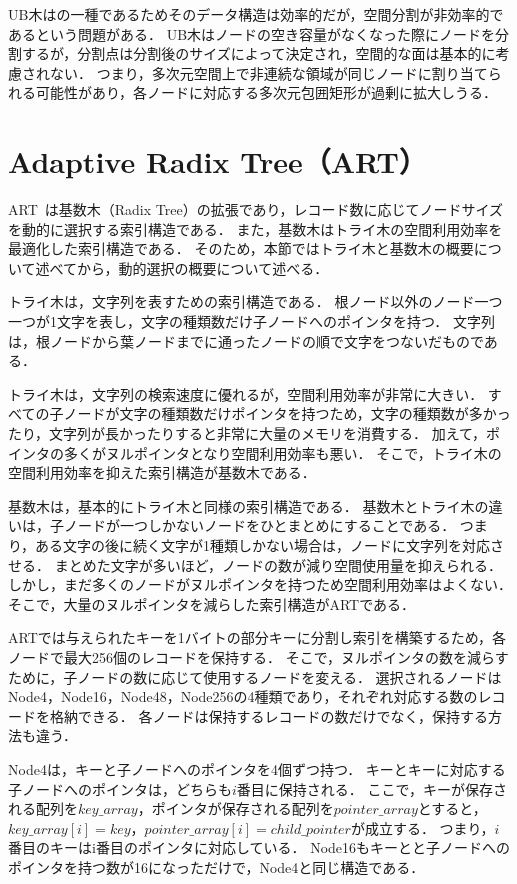 UB木は\BTree{}の一種であるためそのデータ構造は効率的だが，空間分割が非効率的であるという問題がある．
UB木はノードの空き容量がなくなった際にノードを分割するが，分割点は分割後のサイズによって決定され，空間的な面は基本的に考慮されない．
つまり，多次元空間上で非連続な領域が同じノードに割り当てられる可能性があり，各ノードに対応する多次元包囲矩形が過剰に拡大しうる．

\section{Adaptive Radix Tree（ART）}

ART~\cite{icde:Leis2013}は基数木（Radix Tree）の拡張であり，レコード数に応じてノードサイズを動的に選択する索引構造である．
また，基数木はトライ木の空間利用効率を最適化した索引構造である．
そのため，本節ではトライ木と基数木の概要について述べてから，動的選択の概要について述べる．

トライ木は，文字列を表すための索引構造である．
根ノード以外のノード一つ一つが1文字を表し，文字の種類数だけ子ノードへのポインタを持つ．
文字列は，根ノードから葉ノードまでに通ったノードの順で文字をつないだものである．

トライ木は，文字列の検索速度に優れるが，空間利用効率が非常に大きい．
すべての子ノードが文字の種類数だけポインタを持つため，文字の種類数が多かったり，文字列が長かったりすると非常に大量のメモリを消費する．
加えて，ポインタの多くがヌルポインタとなり空間利用効率も悪い．
そこで，トライ木の空間利用効率を抑えた索引構造が基数木である．

基数木は，基本的にトライ木と同様の索引構造である．
基数木とトライ木の違いは，子ノードが一つしかないノードをひとまとめにすることである．
つまり，ある文字の後に続く文字が1種類しかない場合は，ノードに文字列を対応させる．
まとめた文字が多いほど，ノードの数が減り空間使用量を抑えられる．
しかし，まだ多くのノードがヌルポインタを持つため空間利用効率はよくない．
そこで，大量のヌルポインタを減らした索引構造がARTである．

ARTでは与えられたキーを1バイトの部分キーに分割し索引を構築するため，各ノードで最大256個のレコードを保持する．
そこで，ヌルポインタの数を減らすために，子ノードの数に応じて使用するノードを変える．
選択されるノードはNode4，Node16，Node48，Node256の4種類であり，それぞれ対応する数のレコードを格納できる．
各ノードは保持するレコードの数だけでなく，保持する方法も違う．

Node4は，キーと子ノードへのポインタを4個ずつ持つ．
キーとキーに対応する子ノードへのポインタは，どちらも$i$番目に保持される．
ここで，キーが保存される配列を$key\_array$，ポインタが保存される配列を$pointer\_array$とすると，$key\_array[i]=key$，$pointer\_array[i]=child\_pointer$が成立する．
つまり，$i$番目のキーはi番目のポインタに対応している．
Node16もキーとと子ノードへのポインタを持つ数が16になっただけで，Node4と同じ構造である．

